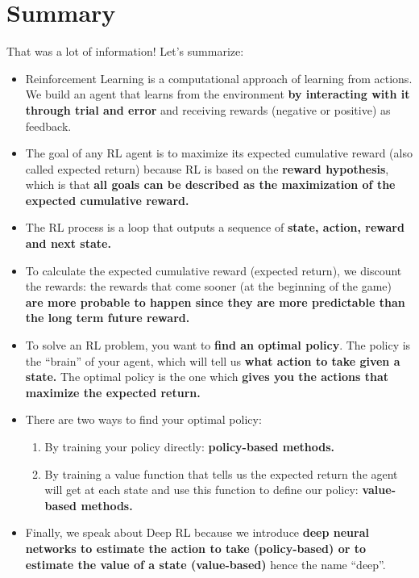 \documentclass[11pt,a4paper]{article}
\begin{document}
\section{Summary}\label{summary}

That was a lot of information! Let's summarize:

\begin{itemize}
\item
  Reinforcement Learning is a computational approach of learning from actions. We build an agent that learns from the environment \textbf{by interacting with it through trial and error} and receiving rewards (negative or positive) as feedback.
\item
  The goal of any RL agent is to maximize its expected cumulative reward (also called expected return) because RL is based on the \textbf{reward hypothesis}, which is that \textbf{all goals can be described as the maximization of the expected cumulative reward.}
\item
  The RL process is a loop that outputs a sequence of \textbf{state, action, reward and next state.}
\item
  To calculate the expected cumulative reward (expected return), we discount the rewards: the rewards that come sooner (at the beginning of the game) \textbf{are more probable to happen since they are more predictable than the long term future reward.}
\item
  To solve an RL problem, you want to \textbf{find an optimal policy}. The policy is the ``brain'' of your agent, which will tell us \textbf{what action to take given a state.} The optimal policy is the one which \textbf{gives you the actions that maximize the expected return.}
\item
  There are two ways to find your optimal policy:

  \begin{enumerate}
  \def\labelenumi{\arabic{enumi}.}
  \tightlist
  \item
    By training your policy directly: \textbf{policy-based methods.}
  \item
    By training a value function that tells us the expected return the agent will get at each state and use this function to define our policy: \textbf{value-based methods.}
  \end{enumerate}
\item
  Finally, we speak about Deep RL because we introduce \textbf{deep neural networks to estimate the action to take (policy-based) or to estimate the value of a state (value-based)} hence the name ``deep''.
\end{itemize}
\end{document}
